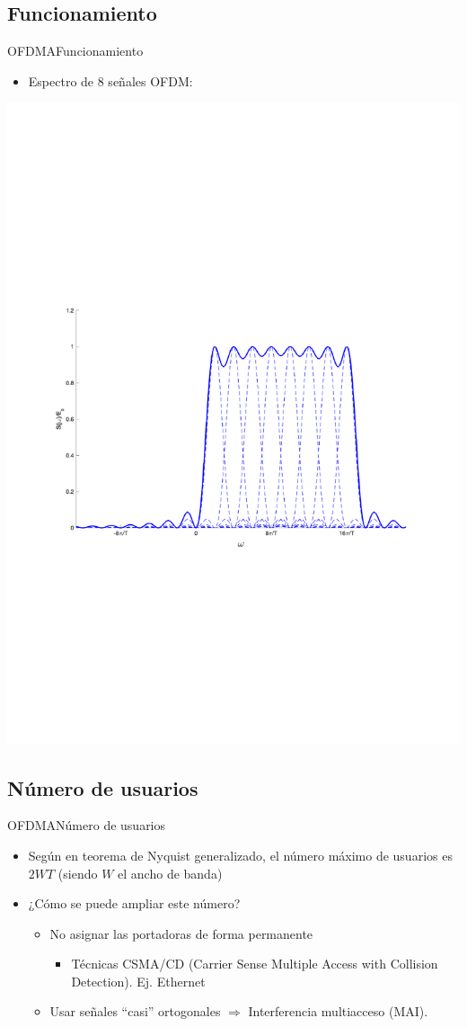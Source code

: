 \documentclass[10pt,compress]{beamer} %
\begin{document}
\subsection{Funcionamiento}
\begin{frame}{OFDMA}{Funcionamiento}
  \begin{itemize}
    \item Espectro de 8 señales OFDM:
  \end{itemize}
  \centering \includegraphics[width=0.8\linewidth]{Figuras/OFDM.pdf}
\end{frame}

\subsection{Número de usuarios}
\begin{frame}{OFDMA}{Número de usuarios}
  \begin{itemize}
    \item Según en teorema de Nyquist generalizado, el número máximo de usuarios es $2WT$ (siendo $W$ el ancho de banda)
    \item ¿Cómo se puede ampliar este número?
      \begin{itemize}
        \item No asignar las portadoras de forma permanente
        \begin{itemize}
          \item Técnicas CSMA/CD (Carrier Sense Multiple Access with Collision Detection). Ej. Ethernet
        \end{itemize}
        \item Usar señales ``casi'' ortogonales $\Rightarrow$ Interferencia multiacceso (MAI).
      \end{itemize}
  \end{itemize}
\end{frame}
\end{document}
